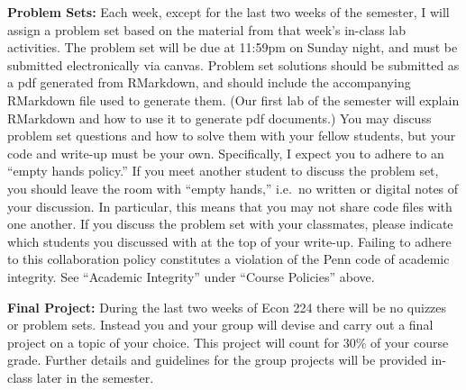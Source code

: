 \documentclass[11pt, letterpaper]{article}
\begin{document}
\noindent \textbf{Problem Sets:} Each week, except for the last two weeks of the semester, I will assign a problem set based on the material from that week's in-class lab activities.
The problem set will be due at 11:59pm on Sunday night, and must be submitted electronically via canvas.
Problem set solutions should be submitted as a pdf generated from RMarkdown, and should include the accompanying RMarkdown file used to generate them.
(Our first lab of the semester will explain RMarkdown and how to use it to generate pdf documents.)
You may discuss problem set questions and how to solve them with your fellow students, but your code and write-up must be your own. 
Specifically, I expect you to adhere to an ``empty hands policy.'' 
If you meet another student to discuss the problem set, you should leave the room with ``empty hands,'' i.e.\ no written or digital notes of your discussion.
In particular, this means that you may not share code files with one another.
If you discuss the problem set with your classmates, please indicate which students you discussed with at the top of your write-up.
Failing to adhere to this collaboration policy constitutes a violation of the Penn code of academic integrity.
See ``Academic Integrity'' under ``Course Policies'' above.



\medskip

\noindent \textbf{Final Project:} During the last two weeks of Econ 224 there will be no quizzes or problem sets.
Instead you and your group will devise and carry out a final project on a topic of your choice. 
This project will count for 30\% of your course grade.
Further details and guidelines for the group projects will be provided in-class later in the semester.



\newpage


\end{document}
